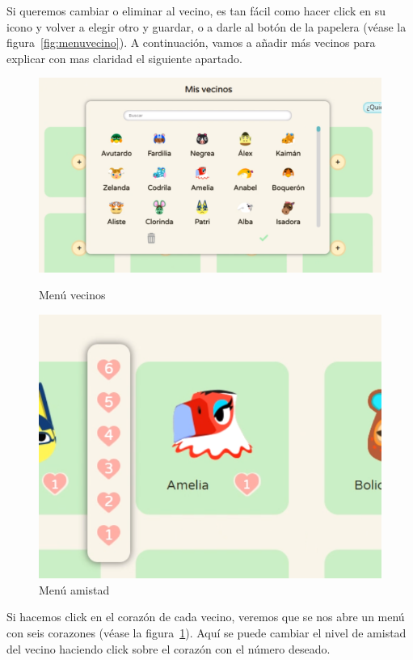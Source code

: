 \clearpage

Si queremos cambiar o eliminar al vecino, es tan fácil como hacer click en su icono y volver a elegir otro y guardar, o a darle al botón de la papelera {(v\'ease la figura~\ref{fig:menuvecino})}. A continuación, vamos a añadir más vecinos para explicar con mas claridad el siguiente apartado.\\

\begin{figure}[!htb]
	\begin{minipage}{0.48\textwidth}
		\centering
		\includegraphics[width=.9\linewidth]{img/cap9/42-menu-vecinos.png}
		\caption{Menú vecinos}
		\label{fig:menuvecino}
	\end{minipage}\hfill
	\begin{minipage}{0.48\textwidth}
		\centering
		\includegraphics[width=.7\linewidth]{img/cap9/43-menu-amistad.png}
		\caption{Menú amistad}
		\label{fig:menuamistad}
	\end{minipage}
\end{figure}

Si hacemos click en el corazón de cada vecino, veremos que se nos abre un menú con seis corazones {(v\'ease la figura~\ref{fig:menuamistad})}. Aquí se puede cambiar el nivel de amistad del vecino haciendo click sobre el corazón con el número deseado.\\

